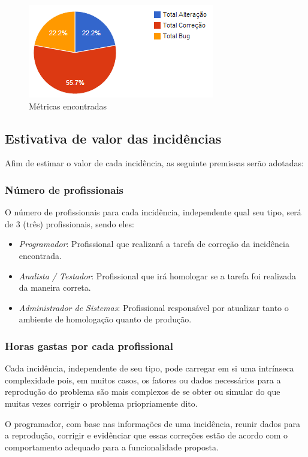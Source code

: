 \documentclass[11pt, a4paper]{article}
\begin{document}
\begin{figure}[H]
  \caption{Métricas encontradas}
  \centering 
  \includegraphics{images/graphic.png}
\end{figure}
\cite{metricas-sao-silvestre}

\subsection{Estivativa de valor das incidências}
Afim de estimar o valor de cada incidência, as seguinte premissas serão adotadas:

\subsubsection{Número de profissionais}
O número de profissionais para cada incidência, independente qual seu tipo, será de 3 (três) profissionais, sendo eles:

\begin{itemize}
	\item \textit{Programador}: Profissional que realizará a tarefa de correção da incidência encontrada.
	\item \textit{Analista / Testador}: Profissional que irá homologar se a tarefa foi realizada da maneira correta.
	\item \textit{Administrador de Sistemas}: Profissional responsável por atualizar tanto o ambiente de homologação quanto de produção.
\end{itemize}

\subsubsection{Horas gastas por cada profissional}
Cada incidência, independente de seu tipo, pode carregar em si uma intrínseca complexidade pois, em muitos casos, os fatores ou dados necessários  para a reprodução do problema são mais complexos de se obter ou simular do que muitas vezes corrigir o problema priopriamente dito.

O programador, com base nas informações de uma incidência, reunir dados para a reprodução, corrigir e evidênciar que essas correções estão de acordo com o comportamento adequado para a funcionalidade proposta.
\end{document}
